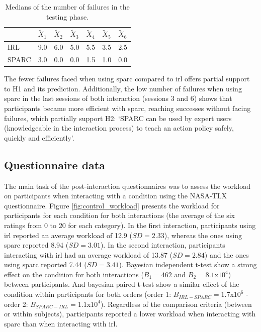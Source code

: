 \begin{table}[ht]
	\centering
	\caption{Medians of the number of failures in the testing phase.}
	\label{tab:control_failures}
	\begin{tabular}{@{}lllllll@{}}\toprule
		& $\widetilde{X}_{1}$ & $\widetilde{X}_{2}$ & $\widetilde{X}_{3}$ & $\widetilde{X}_{4}$ & $\widetilde{X}_{5}$ & $\widetilde{X}_{6}$\\ 
		\midrule
	    IRL & 9.0 & 6.0 & 5.0 & 5.5 & 3.5 & 2.5\\
	    SPARC & 3.0 & 0.0 & 0.0 & 1.5 & 1.0 & 0.0\\
	    \bottomrule
	\end{tabular}
\end{table}

The fewer failures faced when using \gls{sparc} compared to \gls{irl} offers partial support to H1 and its prediction. Additionally, the low number of failures when using \gls{sparc} in the last sessions of both interaction (sessions 3 and 6) shows that participants became more efficient with \gls{sparc}, reaching successes without facing failures, which partially support H2: `SPARC can be used by expert users (knowledgeable in the interaction process) to teach an action policy safely, quickly and efficiently'.

\subsection{Questionnaire data}

The main task of the post-interaction questionnaires was to assess the workload on participants when interacting with a condition using the NASA-TLX questionnaire. Figure \ref{fig:control_workload} presents the workload for participants for each condition for both interactions (the average of the six ratings from 0 to 20 for each category). In the first interaction, participants using \gls{irl} reported an average workload of 12.9 ($SD=2.33$), whereas the ones using \gls{sparc} reported 8.94 ($SD=3.01$). In the second interaction, participants interacting with \gls{irl} had an average workload of 13.87 ($SD=2.84$) and the ones using \gls{sparc} reported 7.44 ($SD=3.41$). Bayesian independent t-test show a strong effect on the condition for both interactions ($B_1=462$ and $B_2=8.1$x$10^4$) between participants. And bayesian paired t-test show a similar effect of the condition within participants for both orders (order 1: $B_{IRL-SPARC}=1.7$x$10^6$ - order 2: $B_{SPARC-IRL}=1.1$x$10^4$). Regardless of the comparison criteria (between or within subjects), participants reported a lower workload when interacting with \gls{sparc} than when interacting with \gls{irl}.

